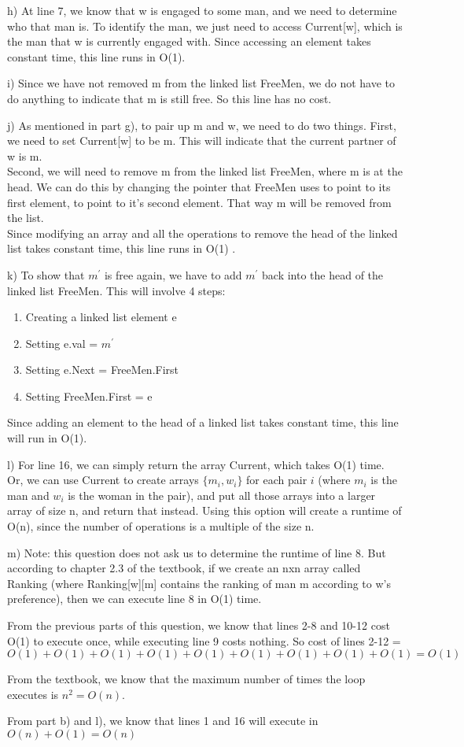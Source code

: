 \documentclass{article}
\begin{document}
h) At line 7, we know that w is engaged to some man, and we need to determine who that man is. To identify the man, we just need to access Current[w], which is the man that w is currently engaged with. Since accessing an element takes constant time, this line runs in O(1).

i) Since we have not removed m from the linked list FreeMen, we do not have to do anything to indicate that m is still free. So this line has no cost.

j) As mentioned in part g), to pair up m and w, we need to do two things. First, we need to set Current[w] to be m. This will indicate that the current partner of w is m.\\
Second, we will need to remove m from the linked list FreeMen, where m is at the head. We can do this by changing the pointer that FreeMen uses to point to its first element, to point to it's second element. That way m will be removed from the list.\\
Since modifying an array and all the operations to remove the head of the linked list takes constant time, this line runs in O(1) .


k) To show that $m^\prime$ is free again, we have to add $m^\prime$ back into the head of the linked list FreeMen. This will involve 4 steps: 
\begin{enumerate}
    \item Creating a linked list element e
    \item Setting e.val = $m^\prime$
    \item Setting e.Next = FreeMen.First
    \item Setting FreeMen.First = e
\end{enumerate}

Since adding an element to the head of a linked list takes constant time, this line will run in O(1).

l) For line 16, we can simply return the array Current, which takes O(1) time. Or, we can use Current to create arrays $\{m_i, w_i\}$ for each pair $i$ (where $m_i$ is the man and $w_i$ is the woman in the pair), and put all those arrays into a larger array of size n, and return that instead. Using this option will create a runtime of O(n), since the number of operations is a multiple of the size n.

m) Note: this question does not ask us to determine the runtime of line 8. But according to chapter 2.3 of the textbook, if we create an nxn array called Ranking (where Ranking[w][m] contains the ranking of man m according to w's preference), then we can execute line 8 in O(1) time.

From the previous parts of this question, we know that lines 2-8 and 10-12 cost O(1) to execute once, while executing line 9 costs nothing.
So cost of lines 2-12 = $O(1)+O(1)+O(1)+O(1)+O(1)+O(1)+O(1)+O(1)+O(1)= O(1)$

From the textbook, we know that the maximum number of times the loop executes is $n^2 = O(n)$.

From part b) and l), we know that lines 1 and 16 will execute in $O(n) + O(1) = O(n)$ 
\end{document}
